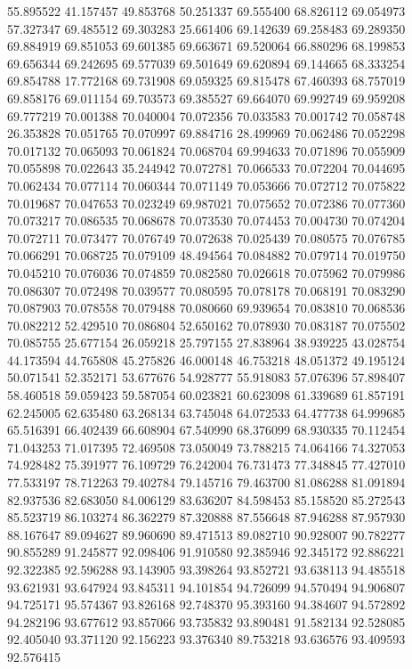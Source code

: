 55.895522
41.157457
49.853768
50.251337
69.555400
68.826112
69.054973
57.327347
69.485512
69.303283
25.661406
69.142639
69.258483
69.289350
69.884919
69.851053
69.601385
69.663671
69.520064
66.880296
68.199853
69.656344
69.242695
69.577039
69.501649
69.620894
69.144665
68.333254
69.854788
17.772168
69.731908
69.059325
69.815478
67.460393
68.757019
69.858176
69.011154
69.703573
69.385527
69.664070
69.992749
69.959208
69.777219
70.001388
70.040004
70.072356
70.033583
70.001742
70.058748
26.353828
70.051765
70.070997
69.884716
28.499969
70.062486
70.052298
70.017132
70.065093
70.061824
70.068704
69.994633
70.071896
70.055909
70.055898
70.022643
35.244942
70.072781
70.066533
70.072204
70.044695
70.062434
70.077114
70.060344
70.071149
70.053666
70.072712
70.075822
70.019687
70.047653
70.023249
69.987021
70.075652
70.072386
70.077360
70.073217
70.086535
70.068678
70.073530
70.074453
70.004730
70.074204
70.072711
70.073477
70.076749
70.072638
70.025439
70.080575
70.076785
70.066291
70.068725
70.079109
48.494564
70.084882
70.079714
70.019750
70.045210
70.076036
70.074859
70.082580
70.026618
70.075962
70.079986
70.086307
70.072498
70.039577
70.080595
70.078178
70.068191
70.083290
70.087903
70.078558
70.079488
70.080660
69.939654
70.083810
70.068536
70.082212
52.429510
70.086804
52.650162
70.078930
70.083187
70.075502
70.085755
25.677154
26.059218
25.797155
27.838964
38.939225
43.028754
44.173594
44.765808
45.275826
46.000148
46.753218
48.051372
49.195124
50.071541
52.352171
53.677676
54.928777
55.918083
57.076396
57.898407
58.460518
59.059423
59.587054
60.023821
60.623098
61.339689
61.857191
62.245005
62.635480
63.268134
63.745048
64.072533
64.477738
64.999685
65.516391
66.402439
66.608904
67.540990
68.376099
68.930335
70.112454
71.043253
71.017395
72.469508
73.050049
73.788215
74.064166
74.327053
74.928482
75.391977
76.109729
76.242004
76.731473
77.348845
77.427010
77.533197
78.712263
79.402784
79.145716
79.463700
81.086288
81.091894
82.937536
82.683050
84.006129
83.636207
84.598453
85.158520
85.272543
85.523719
86.103274
86.362279
87.320888
87.556648
87.946288
87.957930
88.167647
89.094627
89.960690
89.471513
89.082710
90.928007
90.782277
90.855289
91.245877
92.098406
91.910580
92.385946
92.345172
92.886221
92.322385
92.596288
93.143905
93.398264
93.852721
93.638113
94.485518
93.621931
93.647924
93.845311
94.101854
94.726099
94.570494
94.906807
94.725171
95.574367
93.826168
92.748370
95.393160
94.384607
94.572892
94.282196
93.677612
93.857066
93.735832
93.890481
91.582134
92.528085
92.405040
93.371120
92.156223
93.376340
89.753218
93.636576
93.409593
92.576415
